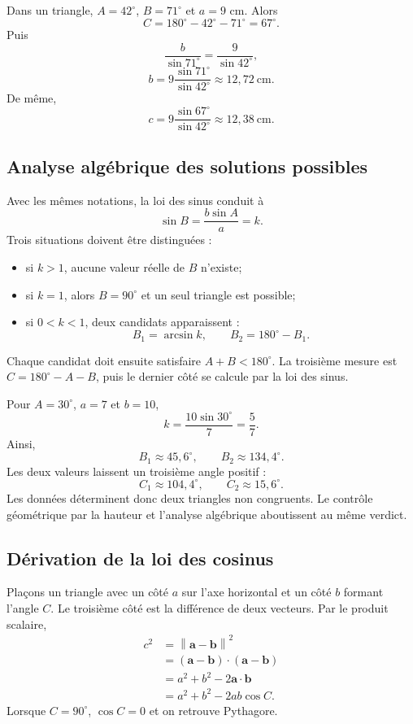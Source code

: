 \documentclass[12pt,a4paper,openany]{book}
\newcommand{\norm}[1]{\left\lVert #1\right\rVert}
\begin{document}
\begin{examplebox}
Dans un triangle, $A=42^\circ$, $B=71^\circ$ et $a=9$ cm. Alors
\[
C=180^\circ-42^\circ-71^\circ=67^\circ.
\]
Puis
\[
\frac b{\sin71^\circ}=\frac9{\sin42^\circ},
\]
\[
b=9\frac{\sin71^\circ}{\sin42^\circ}\approx12{,}72\ \mathrm{cm}.
\]
De même,
\[
c=9\frac{\sin67^\circ}{\sin42^\circ}\approx12{,}38\ \mathrm{cm}.
\]
\end{examplebox}

\subsection{Analyse algébrique des solutions possibles}

Avec les mêmes notations, la loi des sinus conduit à
\[
\sin B=\frac{b\sin A}{a}=k.
\]
Trois situations doivent être distinguées :
\begin{itemize}
\item si $k>1$, aucune valeur réelle de $B$ n'existe;
\item si $k=1$, alors $B=90^\circ$ et un seul triangle est possible;
\item si $0<k<1$, deux candidats apparaissent :
\[
B_1=\arcsin k,
\qquad
B_2=180^\circ-B_1.
\]
\end{itemize}
Chaque candidat doit ensuite satisfaire $A+B<180^\circ$. La troisième mesure est $C=180^\circ-A-B$, puis le dernier côté se calcule par la loi des sinus.

\begin{examplebox}
Pour $A=30^\circ$, $a=7$ et $b=10$,
\[
k=\frac{10\sin30^\circ}{7}=\frac57.
\]
Ainsi,
\[
B_1\approx45{,}6^\circ,
\qquad
B_2\approx134{,}4^\circ.
\]
Les deux valeurs laissent un troisième angle positif :
\[
C_1\approx104{,}4^\circ,
\qquad
C_2\approx15{,}6^\circ.
\]
Les données déterminent donc deux triangles non congruents. Le contrôle géométrique par la hauteur et l'analyse algébrique aboutissent au même verdict.
\end{examplebox}

\subsection{Dérivation de la loi des cosinus}

Plaçons un triangle avec un côté $a$ sur l'axe horizontal et un côté $b$ formant l'angle $C$. Le troisième côté est la différence de deux vecteurs. Par le produit scalaire,
\begin{align*}
c^2
&=\norm{\mathbf a-\mathbf b}^2\\
&=(\mathbf a-\mathbf b)\cdot(\mathbf a-\mathbf b)\\
&=a^2+b^2-2\mathbf a\cdot\mathbf b\\
&=a^2+b^2-2ab\cos C.
\end{align*}
Lorsque $C=90^\circ$, $\cos C=0$ et on retrouve Pythagore.
\end{document}
